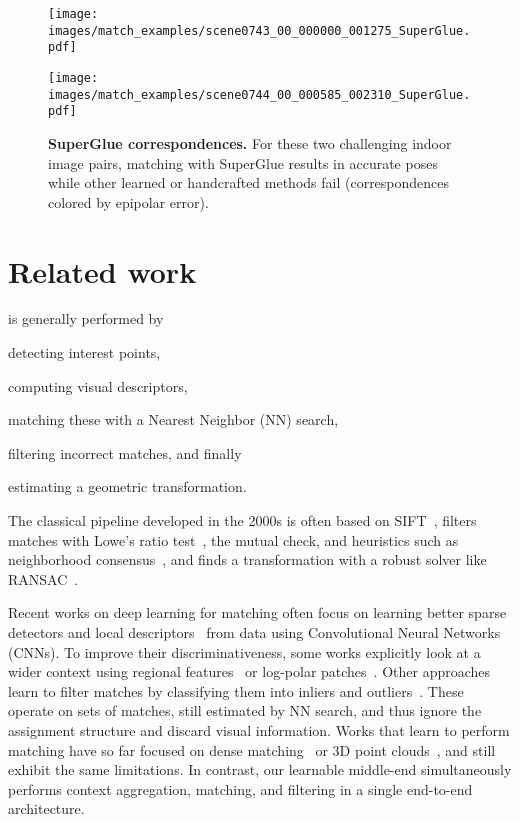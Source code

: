 \documentclass[10pt,twocolumn,letterpaper]{article}
\newcommand{\PAR}[1]{\vskip4pt \noindent{\bf #1~}}
\renewcommand{\*}[1]{\mathbf{#1}}
\newcommand{\0}{\phantom{0}}
\begin{document}
\begin{figure}[t]
    \centering
   \texttt{[image: images/match\_examples/scene0743\_00\_000000\_001275\_SuperGlue.pdf]}
   
   \vspace{1mm}
   \texttt{[image: images/match\_examples/scene0744\_00\_000585\_002310\_SuperGlue.pdf]}\caption{{\bf SuperGlue correspondences.} For these two challenging indoor image pairs, matching with SuperGlue results in accurate poses while other learned or handcrafted methods fail (correspondences colored by epipolar error).}\label{fig:examples}\vspace{-3mm}\end{figure}


\section{Related work}
\PAR{Local feature matching} is generally performed by
\begin{enumerate*}[label=\roman*)]
\item detecting interest points,
\item computing visual descriptors,
\item matching these with a Nearest Neighbor (NN) search,
\item filtering incorrect matches, and finally
\item estimating a geometric transformation.
\end{enumerate*}
The classical pipeline developed in the 2000s is often based on SIFT~\cite{lowe2004distinctive}, filters matches with Lowe's ratio test~\cite{lowe2004distinctive}, the mutual check, and heuristics such as neighborhood consensus~\cite{tuytelaars2000wide, cech2010efficient, bian2017gms, sattler2009scramsac}, and finds a transformation with a robust solver like RANSAC~\cite{fischler1981random, raguram2008comparative}.

Recent works on deep learning for matching often focus on learning better sparse detectors and local descriptors~\cite{superpoint, dusmanu2019d2, ono2018lf, revaud2019r2d2, yi2016lift} from data using Convolutional Neural Networks (CNNs). To improve their discriminativeness, some works explicitly look at a wider context using regional features~\cite{luo2019contextdesc} or log-polar patches~\cite{ebel2019beyond}. Other approaches learn to filter matches by classifying them into inliers and outliers~\cite{moo2018learning, ranftl2018deep, brachmann2019neural, zhang2019learning}. These operate on sets of matches, still estimated by NN search, and thus ignore the assignment structure and discard visual information. Works that learn to perform matching have so far focused on dense matching~\cite{rocco2018neighbourhood} or 3D point clouds~\cite{wang2019deep}, and still exhibit the same limitations. In contrast, our learnable middle-end simultaneously performs context aggregation, matching, and filtering in a single end-to-end architecture.
\end{document}

